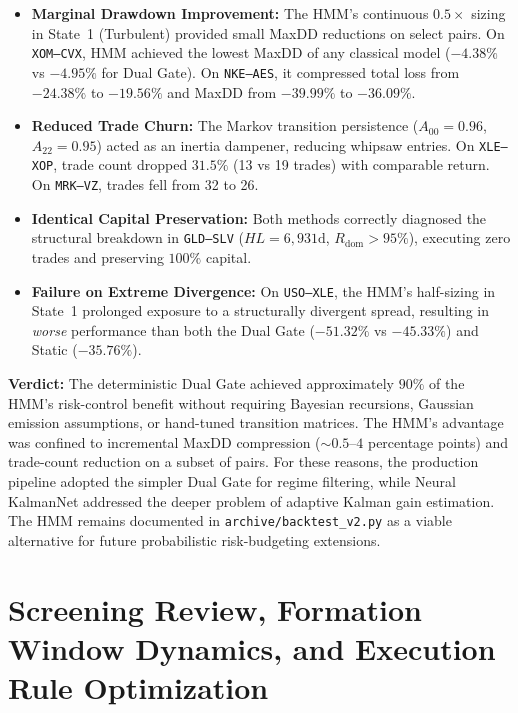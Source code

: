 \documentclass[11pt, a4paper]{article}
\begin{document}
\begin{itemize}
    \item \textbf{Marginal Drawdown Improvement:} The HMM's continuous $0.5\times$ sizing in State~1 (Turbulent) provided small MaxDD reductions on select pairs. On \texttt{XOM--CVX}, HMM achieved the lowest MaxDD of any classical model ($-4.38\%$ vs $-4.95\%$ for Dual Gate). On \texttt{NKE--AES}, it compressed total loss from $-24.38\%$ to $-19.56\%$ and MaxDD from $-39.99\%$ to $-36.09\%$.
    \item \textbf{Reduced Trade Churn:} The Markov transition persistence ($A_{00} = 0.96$, $A_{22} = 0.95$) acted as an inertia dampener, reducing whipsaw entries. On \texttt{XLE--XOP}, trade count dropped $31.5\%$ (13 vs 19 trades) with comparable return. On \texttt{MRK--VZ}, trades fell from 32 to 26.
    \item \textbf{Identical Capital Preservation:} Both methods correctly diagnosed the structural breakdown in \texttt{GLD--SLV} ($HL = 6{,}931\text{d}$, $R_{\text{dom}} > 95\%$), executing zero trades and preserving $100\%$ capital.
    \item \textbf{Failure on Extreme Divergence:} On \texttt{USO--XLE}, the HMM's half-sizing in State~1 prolonged exposure to a structurally divergent spread, resulting in \textit{worse} performance than both the Dual Gate ($-51.32\%$ vs $-45.33\%$) and Static ($-35.76\%$).
\end{itemize}

\noindent\textbf{Verdict:} The deterministic Dual Gate achieved approximately $90\%$ of the HMM's risk-control benefit without requiring Bayesian recursions, Gaussian emission assumptions, or hand-tuned transition matrices. The HMM's advantage was confined to incremental MaxDD compression ($\sim$$0.5$--$4$ percentage points) and trade-count reduction on a subset of pairs. For these reasons, the production pipeline adopted the simpler Dual Gate for regime filtering, while Neural KalmanNet addressed the deeper problem of adaptive Kalman gain estimation. The HMM remains documented in \texttt{archive/backtest\_v2.py} as a viable alternative for future probabilistic risk-budgeting extensions.

\section{Screening Review, Formation Window Dynamics, and Execution Rule Optimization}
\end{document}
